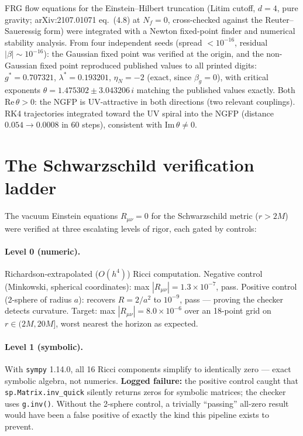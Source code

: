 \documentclass[11pt]{article}
\begin{document}
FRG flow equations for the Einstein--Hilbert truncation (Litim cutoff, $d{=}4$,
pure gravity; arXiv:2107.01071 eq.~(4.8) at $N_f{=}0$, cross-checked against
the Reuter--Saueressig form) were integrated with a Newton fixed-point finder
and numerical stability analysis. From four independent seeds (spread
$<10^{-16}$, residual $|\beta| \sim 10^{-16}$): the Gaussian fixed point was
verified at the origin, and the non-Gaussian fixed point reproduced published
values to all printed digits: $g^* = 0.707321$, $\lambda^* = 0.193201$,
$\eta_N = -2$ (exact, since $\beta_g = 0$), with critical exponents
$\theta = 1.475302 \pm 3.043206\,i$ matching the published values exactly.
Both $\mathrm{Re}\,\theta > 0$: the NGFP is UV-attractive in both directions
(two relevant couplings). RK4 trajectories integrated toward the UV spiral
into the NGFP (distance $0.054 \to 0.0008$ in 60 steps), consistent with
$\mathrm{Im}\,\theta \neq 0$.

\section{The Schwarzschild verification ladder}

The vacuum Einstein equations $R_{\mu\nu} = 0$ for the Schwarzschild metric
($r > 2M$) were verified at three escalating levels of rigor, each gated by
controls:

\paragraph{Level 0 (numeric).} Richardson-extrapolated ($O(h^4)$) Ricci
computation. Negative control (Minkowski, spherical coordinates): max
$|R_{\mu\nu}| = 1.3\times 10^{-7}$, pass. Positive control (2-sphere of
radius $a$): recovers $R = 2/a^2$ to $10^{-9}$, pass --- proving the checker
detects curvature. Target: max $|R_{\mu\nu}| = 8.0\times 10^{-6}$ over an
18-point grid on $r \in (2M, 20M]$, worst nearest the horizon as expected.

\paragraph{Level 1 (symbolic).} With \texttt{sympy} 1.14.0, all 16 Ricci
components simplify to identically zero --- exact symbolic algebra, not
numerics. \textbf{Logged failure:} the positive control caught that
\texttt{sp.Matrix.inv\_quick} silently returns zeros for symbolic matrices;
the checker uses \texttt{g.inv()}. Without the 2-sphere control, a trivially
``passing'' all-zero result would have been a false positive of exactly the
kind this pipeline exists to prevent.
\end{document}

